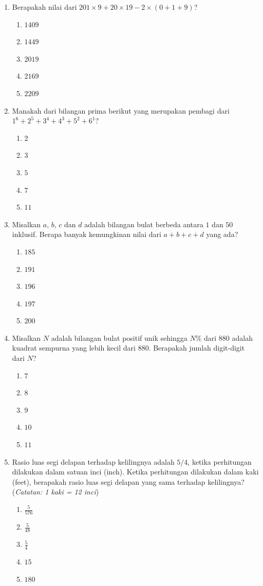 \documentclass[12pt]{scrartcl}
\begin{document}
\begin{enumerate}

\item Berapakah nilai dari $201\times9+20\times19-2\times(0+1+9)$?
\begin{enumerate}
    \item $1409$
    \item $1449$
    \item $2019$
    \item $2169$
    \item $2209$
\end{enumerate}

\item Manakah dari bilangan prima berikut yang merupakan pembagi dari $1^{6}+2^{5}+3^{4}+4^{3}+5^{2}+6^{1}$?
\begin{enumerate}
    \item $2$
    \item $3$
    \item $5$
    \item $7$
    \item $11$
\end{enumerate}

\item Misalkan $a$, $b$, $c$ dan $d$ adalah bilangan bulat berbeda antara $1$ dan $50$ inklusif. Berapa banyak kemungkinan nilai dari $a+b+c+d$ yang ada?
\begin{enumerate}
    \item $185$
    \item $191$
    \item $196$
    \item $197$
    \item $200$
\end{enumerate}

\item Misalkan $N$ adalah bilangan bulat positif unik sehingga $N$\% dari $880$ adalah kuadrat sempurna yang lebih kecil dari $880$. Berapakah jumlah digit-digit dari $N$?
\begin{enumerate}
    \item $7$
    \item $8$
    \item $9$
    \item $10$
    \item $11$
\end{enumerate}

\item Rasio luas segi delapan terhadap kelilingnya adalah $5/4$, ketika perhitungan dilakukan dalam satuan inci (inch). Ketika perhitungan dilakukan dalam kaki (feet), berapakah rasio luas segi delapan yang sama terhadap kelilingnya? (\textit{Catatan: 1 kaki = 12 inci})
\begin{enumerate}
    \item $\frac{5}{576}$
    \item $\frac{5}{48}$
    \item $\frac{5}{4}$
    \item $15$
    \item $180$
\end{enumerate}


\end{enumerate}
\end{document}
